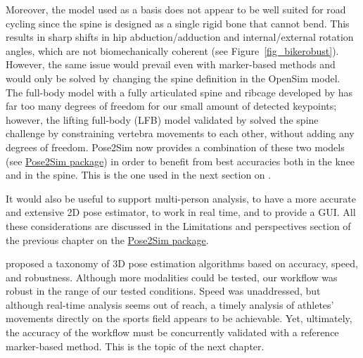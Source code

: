 Moreover, the \cite{Rajagopal2016} model used as a basis does not appear to be well suited for road cycling since the spine is designed as a single rigid bone that cannot bend. This results in sharp shifts in hip abduction/adduction and internal/external rotation angles, which are not biomechanically coherent (see Figure~\ref{fig_bikerobust}). However, the same issue would prevail even with marker-based methods and would only be solved by changing the spine definition in the OpenSim model. The full-body model with a fully articulated spine and ribcage developed by \cite{Bruno2015} has far too many degrees of freedom for our small amount of detected keypoints; however, the lifting full-body (LFB) model validated by \cite{Beaucage-Gauvreau2019} solved the spine challenge by constraining vertebra movements to each other, without adding any degrees of freedom. Pose2Sim now provides a combination of these two models (see \hyperref[ch:3]{Pose2Sim package}) in order to benefit from best accuracies both in the knee and in the spine. This is the one used in the next section on .

It would also be useful to support multi-person analysis, to have a more accurate and extensive 2D pose estimator, to work in real time, and to provide a GUI. All these considerations are discussed in the Limitations and perspectives section of the previous chapter on the \hyperref[ch:3]{Pose2Sim package}.

\cite{Desmarais2021} proposed a taxonomy of 3D pose estimation algorithms based on accuracy, speed, and robustness. Although more modalities could be tested, our workflow was robust in the range of our tested conditions. Speed was unaddressed, but although real-time analysis seems out of reach, a timely analysis of athletes' movements directly on the sports field appears to be achievable. Yet, ultimately, the accuracy of the workflow must be concurrently validated with a reference marker-based method. This is the topic of the next chapter.